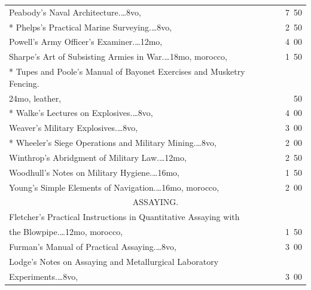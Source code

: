 \documentclass[a4paper,12pt]{book}[2004/02/16]
\theoremstyle{ilemma}
\theoremstyle{itheorem}
\theoremstyle{iother}
\theoremstyle{icorollary}
\theoremstyle{numcorollary}
\theoremstyle{idefinition}
\begin{document}
\begin{longtable}{@{}l@{ }r@{}}
Peabody's Naval Architecture.\dotfill\ldots 8vo, &7\ 50\\

* Phelps's Practical Marine Surveying.\dotfill\ldots 8vo, &2\ 50\\

Powell's Army Officer's Examiner.\dotfill\ldots 12mo, &4\ 00\\

Sharpe's Art of Subsisting Armies in War.\dotfill\ldots 18mo, morocco,
&1\ 50\\

* Tupes and Poole's Manual of Bayonet Exercises and Musketry Fencing.\\

\nopagebreak
\hfill 24mo, leather, &50\\

* Walke's Lectures on Explosives.\dotfill\ldots 8vo, &4\ 00\\

Weaver's Military Explosives.\dotfill\ldots 8vo, &3\ 00\\

* Wheeler's Siege Operations and Military Mining.\dotfill\ldots 8vo,
  &2\ 00\\

Winthrop's Abridgment of Military Law.\dotfill\ldots 12mo, &2\ 50\\

Woodhull's Notes on Military Hygiene.\dotfill\ldots 16mo, &1\ 50\\

Young's Simple Elements of Navigation.\dotfill\ldots 16mo, morocco,
&2\ 00\\[3em]

\multicolumn{2}{c}{\large ASSAYING.}\\[1em]
\nopagebreak
Fletcher's Practical Instructions in Quantitative Assaying with\\

\nopagebreak
\indent\indent the Blowpipe.\dotfill\ldots 12mo, morocco, &1\ 50\\

Furman's Manual of Practical Assaying.\dotfill\ldots 8vo, &3\ 00\\

Lodge's Notes on Assaying and Metallurgical Laboratory\\

\nopagebreak
\indent\indent Experiments.\dotfill\ldots 8vo,&3\ 00\\


\end{longtable}
\end{document}
